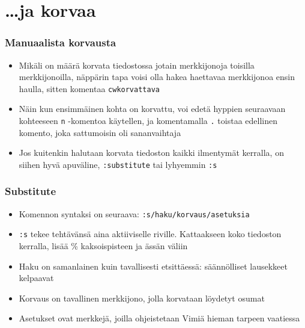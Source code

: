 \documentclass[]{beamer}
\newcommand{\Tohj}[1]{\texttt{#1}}
\newcommand{\com}[1]{{\color{blue!50!black}\Tohj{#1}} \!\!}
\begin{document}
\section{\ldots ja korvaa}

\begin{frame}
    \frametitle{Manuaalista korvausta}
    \begin{itemize}
        \item Mikäli on määrä korvata tiedostossa jotain merkkijonoja toisilla merkkijonoilla, näppärin tapa voisi olla hakea haettavaa merkkijonoa ensin haulla, sitten komentaa \com{cw{\color{red}korvattava}}
        \item Näin kun ensimmäinen kohta on korvattu, voi edetä hyppien seuraavaan kohteeseen \com{n}-komentoa käytellen, ja komentamalla \com{.} toistaa edellinen komento, joka sattumoisin oli sananvaihtaja
        \pause
        \item Jos kuitenkin halutaan korvata tiedoston kaikki ilmentymät kerralla, on siihen hyvä apuväline, \com{:substitute} tai lyhyemmin \com{:s}
    \end{itemize}
\end{frame}

\begin{frame}
    \frametitle{Substitute}
    \begin{itemize}
        \item Komennon syntaksi on seuraava: \com{:s/{\color{red}haku}/{\color{purple}korvaus}/{\color{blue}asetuksia}}
        \item \com{:s} tekee tehtävänsä aina aktiiviselle riville. Kattaakseen koko tiedoston kerralla, lisää \% kaksoispisteen ja ässän väliin
        \pause
        \item {\color{red}Haku} on samanlainen kuin tavallisesti etsittäessä: säännölliset lausekkeet kelpaavat
        \item {\color{purple}Korvaus} on tavallinen merkkijono, jolla korvataan löydetyt osumat
        \item {\color{blue}Asetukset} ovat merkkejä, joilla ohjeistetaan Vimiä hieman tarpeen vaatiessa
    \end{itemize}
\end{frame}
\end{document}
